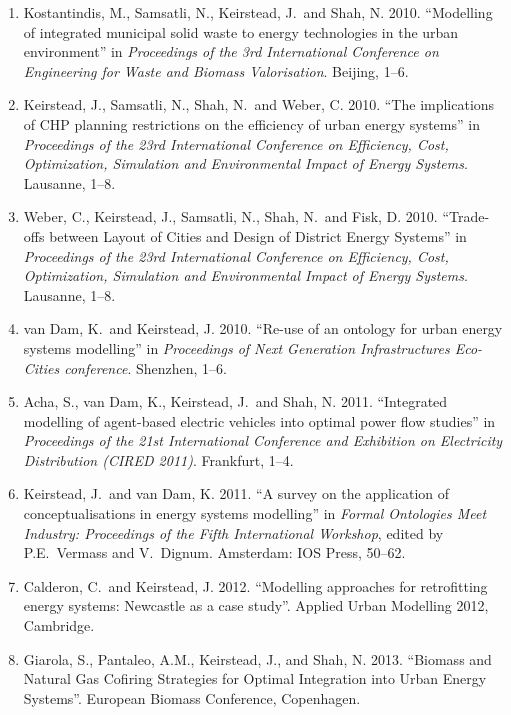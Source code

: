 \documentclass[11pt,a4paper]{article}
\begin{document}
\begin{enumerate}
\item Kostantindis, M., Samsatli, N., Keirstead, J.\  and Shah, N. 2010. ``Modelling of integrated municipal solid waste to energy technologies in the urban environment'' in \emph{Proceedings of the 3rd International Conference on Engineering for Waste and Biomass Valorisation}.  Beijing, 1--6.

\item Keirstead, J., Samsatli, N., Shah, N.\  and Weber, C. 2010. ``The implications of CHP planning restrictions on the efficiency of urban energy systems'' in \emph{Proceedings of the 23rd International Conference on Efficiency, Cost, Optimization, Simulation and Environmental Impact of Energy Systems}.  Lausanne, 1--8.

\item Weber, C., Keirstead, J., Samsatli, N., Shah, N.\  and Fisk, D. 2010. ``Trade-offs between Layout of Cities and Design of District Energy Systems'' in \emph{Proceedings of the 23rd International Conference on Efficiency, Cost, Optimization, Simulation and Environmental Impact of Energy Systems}.  Lausanne, 1--8.

\item van Dam, K.\ and Keirstead, J. 2010. ``Re-use of an ontology for urban energy systems modelling'' in \emph{Proceedings of Next Generation Infrastructures Eco-Cities conference}.  Shenzhen, 1--6.

\item Acha, S., van Dam, K., Keirstead, J.\  and Shah, N. 2011. ``Integrated modelling of agent-based electric vehicles into optimal power flow studies'' in \emph{Proceedings of the 21st International Conference and Exhibition on Electricity Distribution (CIRED 2011)}.  Frankfurt, 1--4.

\item Keirstead, J.\  and van Dam, K. 2011. ``A survey on the application of conceptualisations in energy systems modelling'' in \emph{Formal Ontologies Meet Industry: Proceedings of the Fifth International Workshop}, edited by P.E.\ Vermass and V.\ Dignum.  Amsterdam: IOS Press, 50--62.

\item Calderon, C.\  and Keirstead, J. 2012. ``Modelling approaches for retrofitting energy systems: Newcastle as a case study''.  Applied Urban Modelling 2012, Cambridge.

\item Giarola, S., Pantaleo, A.M., Keirstead, J., and Shah, N. 2013. ``Biomass and Natural Gas Cofiring Strategies for Optimal Integration into Urban Energy Systems''.  European Biomass Conference, Copenhagen.


\end{enumerate}
\end{document}
